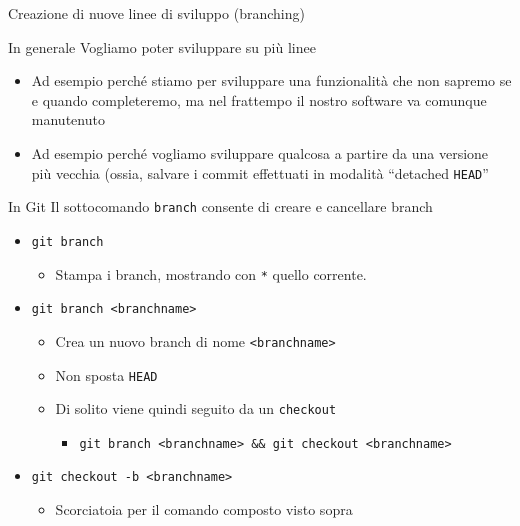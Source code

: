 \documentclass[xcolor=dvipsnames,presentation]{beamer}
\begin{document}
\begin{frame}{Creazione di nuove linee di sviluppo (branching)}
    \begin{block}{In generale}
        Vogliamo poter sviluppare su più linee
        \begin{itemize}
            \item Ad esempio perché stiamo per sviluppare una funzionalità che non sapremo se e quando completeremo, ma nel frattempo il nostro software va comunque manutenuto
            \item Ad esempio perché vogliamo sviluppare qualcosa a partire da una versione più vecchia (ossia, salvare i commit effettuati in modalità ``detached \texttt{HEAD}''
        \end{itemize}
    \end{block}
    \begin{block}{In Git}
        Il sottocomando \texttt{branch} consente di creare e cancellare branch
        \begin{itemize}
            \item \texttt{git branch}
            \begin{itemize}
                \item Stampa i branch, mostrando con \texttt{*} quello corrente.
            \end{itemize}
            \item \texttt{git branch <branchname>}
            \begin{itemize}
                \item Crea un nuovo branch di nome \texttt{<branchname>}
                \item Non sposta \texttt{HEAD}
                \item Di solito viene quindi seguito da un \texttt{checkout}
                \begin{itemize}
                    \item \texttt{git branch <branchname> \&\& git checkout <branchname>}
                \end{itemize}
            \end{itemize}
            \item \texttt{git checkout -b <branchname>}
            \begin{itemize}
                \item Scorciatoia per il comando composto visto sopra
            \end{itemize}
        \end{itemize}

\end{block}
\end{frame}
\end{document}

